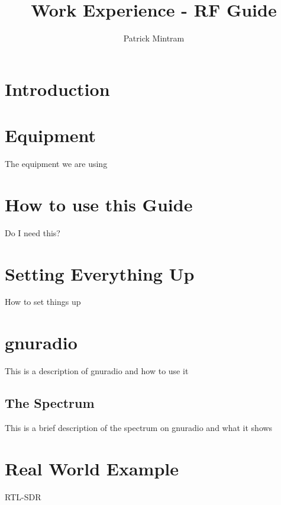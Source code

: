 \documentclass[titlepage,a4paper]{article}
\begin{document}
\title{Work Experience - RF Guide}
\author{Patrick Mintram}
\maketitle

\tableofcontents
\listoffigures

\section{Introduction}


\section{Equipment}
The equipment we are using
\section{How to use this Guide}
Do I need this?
\section{Setting Everything Up}
How to set things up
\section{gnuradio}
This is a description of gnuradio and how to use it
\subsection{The Spectrum}
This is a brief description of the spectrum on gnuradio and what it shows
\section{Real World Example}
RTL-SDR
\end{document}
